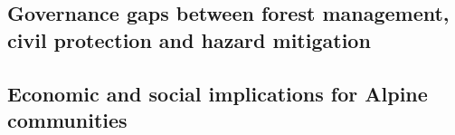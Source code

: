 \documentclass[11pt,a4paper]{article}
\begin{document}
\subsection{Governance gaps between forest management, civil protection and hazard mitigation}

\subsection{Economic and social implications for Alpine communities}










\end{document}
